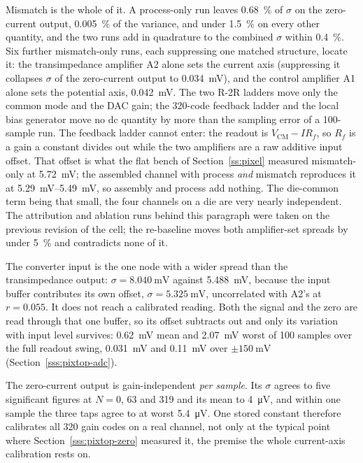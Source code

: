 Mismatch is the whole of it. A process-only run leaves \SI{0.68}{\percent} of
\(\sigma\) on the zero-current output, \SI{0.005}{\percent} of the variance,
and under \SI{1.5}{\percent} on every other quantity, and the two runs add
in quadrature to the combined \(\sigma\) within \SI{0.4}{\percent}. Six further
mismatch-only runs, each suppressing one matched structure, locate it: the
transimpedance amplifier A2 alone sets the current axis (suppressing it
collapses \(\sigma\) of the zero-current output to
\SI{0.034}{\milli\volt}), and the control amplifier A1 alone sets the
potential axis, \SI{0.042}{\milli\volt}. The two R-2R ladders move only the
common mode and the DAC gain; the 320-code feedback ladder and the local bias
generator move no dc quantity by more than the sampling error of a 100-sample
run. The feedback ladder cannot enter: the readout is
\(V_{\mathrm{CM}} - I R_f\), so \(R_f\) is a gain a constant divides out while
the two amplifiers are a raw additive input offset. That offset is what the flat
bench of Section~\ref{ss:pixel} measured mismatch-only at
\SI{5.72}{\milli\volt}; the assembled channel with process \emph{and} mismatch
reproduces it at \SIrange{5.29}{5.49}{\milli\volt}, so assembly and process add
nothing. The die-common term being that small, the four channels on a die are
very nearly independent. The attribution and ablation runs behind this
paragraph were taken on the previous revision of the cell; the re-baseline moves
both amplifier-set spreads by under \SI{5}{\percent} and contradicts none of it.

The converter input is the one node with a wider spread than the transimpedance
output: \(\sigma = \SI{8.040}{\milli\volt}\) against \SI{5.488}{\milli\volt},
because the input buffer contributes its own offset,
\(\sigma = \SI{5.325}{\milli\volt}\), uncorrelated with A2's at \(r = 0.055\).
It does not reach a calibrated reading. Both the signal and the zero are read
through that one buffer, so its offset subtracts out and only its variation with
input level survives: \SI{0.62}{\milli\volt} mean and \SI{2.07}{\milli\volt}
worst of 100 samples over the full readout swing, \SI{0.031}{\milli\volt} and
\SI{0.11}{\milli\volt} over \(\pm\SI{150}{\milli\volt}\)
(Section~\ref{sss:pixtop-adc}).

The zero-current output is gain-independent \emph{per sample}. Its \(\sigma\)
agrees to five significant figures at \(N = 0\), 63 and 319 and its mean to
\SI{4}{\micro\volt}, and within one sample the three taps agree to at worst
\SI{5.4}{\micro\volt}. One stored constant
therefore calibrates all 320 gain codes on a real channel, not only at the
typical point where Section~\ref{sss:pixtop-zero} measured it, the premise
the whole current-axis calibration rests on.


